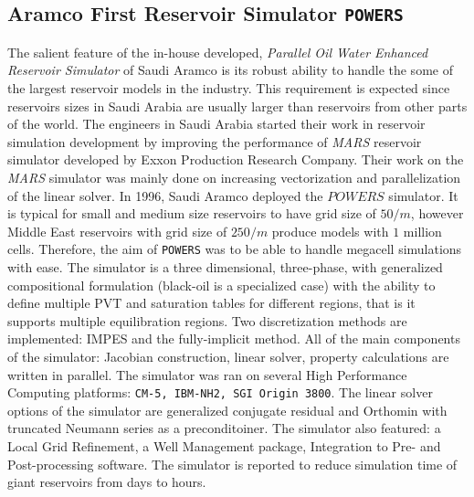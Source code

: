 \documentclass[barcolor=BrickRed,nocopyright,nolists]{asmejour}
\begin{document}
\subsection{Aramco First Reservoir Simulator \texttt{POWERS}}
The salient feature of the in-house developed, \textit{Parallel Oil Water Enhanced Reservoir Simulator}\cite{spe75805} of Saudi Aramco is its robust ability to handle the some of the largest reservoir models in the industry. This requirement is expected since reservoirs sizes in Saudi Arabia are usually larger than reservoirs from other parts of the world. The engineers in Saudi Arabia
started their work in reservoir simulation development by improving the performance of \textit{MARS} reservoir simulator developed by Exxon Production Research Company\cite{spe11483}. Their work on the \textit{MARS} simulator was mainly done on increasing vectorization and parallelization of the linear solver\cite{spe29856}. In 1996, Saudi Aramco deployed the $POWERS$
simulator. It is typical for small and medium size reservoirs to have grid size of $50 / m$, however Middle East reservoirs with grid size of $250 / m$ produce models with $1$ million cells. Therefore, the aim of \texttt{POWERS} was to be able to handle megacell simulations with ease. The simulator is a three dimensional, three-phase, with generalized compositional
formulation (black-oil is a specialized case) with the ability to define multiple PVT and saturation tables for different regions, that is it supports multiple equilibration regions. Two discretization methods are implemented: IMPES and the fully-implicit method. All of the main components of the simulator: Jacobian construction, linear solver, property calculations 
are written in parallel. The simulator was ran on several High Performance Computing platforms: \texttt{CM-5, IBM-NH2, SGI Origin 3800}. The linear solver options of the simulator are generalized conjugate residual and Orthomin with truncated Neumann series as a preconditoiner. The simulator also featured: a Local Grid Refinement, a Well Management package, Integration to 
Pre- and Post-processing software. The simulator is reported to reduce simulation time of giant reservoirs from days to hours.
\end{document}
